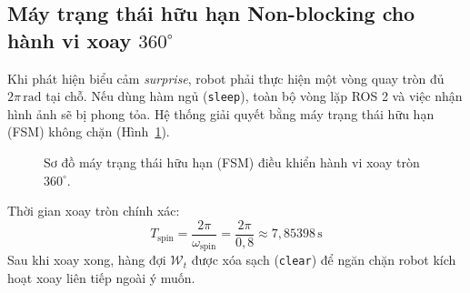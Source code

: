 \subsection{Máy trạng thái hữu hạn Non-blocking cho hành vi xoay $360^\circ$}
Khi phát hiện biểu cảm \textit{surprise}, robot phải thực hiện một vòng quay tròn đủ $2\pi\,\text{rad}$ tại chỗ. Nếu dùng hàm ngủ (\texttt{sleep}), toàn bộ vòng lặp ROS 2 và việc nhận hình ảnh sẽ bị phong tỏa. Hệ thống giải quyết bằng máy trạng thái hữu hạn (FSM) không chặn (Hình~\ref{fig:fsm_diagram}).

\begin{figure}[H]
    \centering
    \caption{Sơ đồ máy trạng thái hữu hạn (FSM) điều khiển hành vi xoay tròn $360^\circ$.}
    \label{fig:fsm_diagram}
\end{figure}

Thời gian xoay tròn chính xác:
\begin{equation}
    T_{\text{spin}} = \frac{2\pi}{\omega_{\text{spin}}} = \frac{2\pi}{0{,}8} \approx 7{,}85398\,\text{s}
\end{equation}
Sau khi xoay xong, hàng đợi $\mathcal{W}_t$ được xóa sạch (\texttt{clear}) để ngăn chặn robot kích hoạt xoay liên tiếp ngoài ý muốn.

